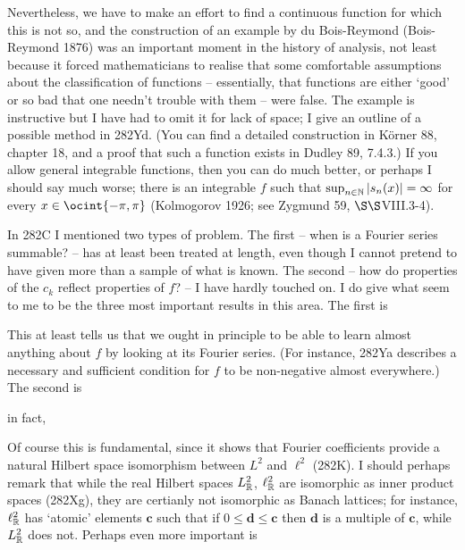 {

\noindent Nevertheless, we have to make an effort to find a continuous
function
for which this is not so, and the construction of an example by du
Bois-Reymond ({\smc Bois-Reymond 1876}) was an important moment in
the history of analysis, not least because it forced mathematicians to
realise that some comfortable assumptions about  the classification of
functions -- essentially, that functions are either `good' or so bad
that one needn't trouble with them -- were false.  The example is
instructive but I have had to omit it for lack of space;  I give an
outline of a possible method in 282Yd.   (You can find a detailed
construction in {\smc K\"orner 88}, chapter 18, and a proof that such a
function exists in {\smc Dudley 89}, 7.4.3.)    If you allow general
integrable functions, then you can do much better, or perhaps I should
say much worse;  there is an integrable $f$ such that $\sup_{n\in\Bbb
N}|s_n(x)|=\infty$ for every $x\in\ocint{-\pi,\pi}$
({\smc Kolmogorov 1926};  see {\smc Zygmund 59}, $\S\S$VIII.3-4).

In 282C I mentioned two types of problem.   The first -- when is a
Fourier
series summable? -- has at least been treated at length, even though I
cannot pretend to have given more than a sample of what is known.   The
second -- how do properties of the $c_k$ reflect properties of $f$? -- I
have hardly touched on.   I do give what seem to me to be the three most
important results in this area.   The first is


\noindent This at least tells us that we ought in principle to be able
to learn almost anything about $f$ by looking at its Fourier series.
(For instance, 282Ya describes a necessary and sufficient condition for
$f$ to be non-negative almost everywhere.)   The second is


\noindent in fact,


\noindent Of course this is fundamental, since it shows that Fourier
coefficients provide a natural Hilbert space isomorphism between $L^2$
and $\ell^2$ (282K).   I should perhaps remark that while the real
Hilbert spaces $L^2_{\Bbb R}$, $\ell^2_{\Bbb R}$ are isomorphic as inner
product spaces (282Xg), they are certianly not isomorphic as Banach
lattices;  for instance, $\ell^2_{\Bbb R}$ has `atomic' elements
$\pmb{c}$ such that if $0\le\pmb{d}\le\pmb{c}$ then $\pmb{d}$ is a
multiple of $\pmb{c}$, while $L^2_{\Bbb R}$ does not.   Perhaps even
more important is

}
